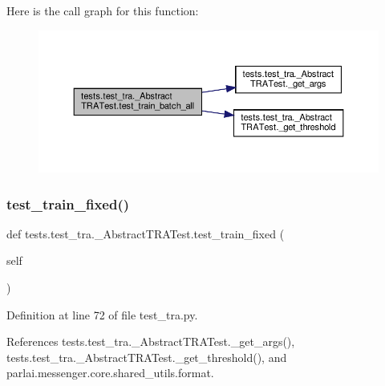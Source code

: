 Here is the call graph for this function\+:
\nopagebreak
\begin{figure}[H]
\begin{center}
\leavevmode
\includegraphics[width=350pt]{classtests_1_1test__tra_1_1__AbstractTRATest_a5e0358ae47540ed9b0583e75ac1d9a49_cgraph}
\end{center}
\end{figure}
\mbox{\label{classtests_1_1test__tra_1_1__AbstractTRATest_a30a5312eaf7639e762ddbd410e31332c}} 
\subsubsection{\texorpdfstring{test\+\_\+train\+\_\+fixed()}{test\_train\_fixed()}}
{\footnotesize\ttfamily def tests.\+test\+\_\+tra.\+\_\+\+Abstract\+T\+R\+A\+Test.\+test\+\_\+train\+\_\+fixed (\begin{DoxyParamCaption}\item[{}]{self }\end{DoxyParamCaption})}



Definition at line 72 of file test\+\_\+tra.\+py.



References tests.\+test\+\_\+tra.\+\_\+\+Abstract\+T\+R\+A\+Test.\+\_\+get\+\_\+args(), tests.\+test\+\_\+tra.\+\_\+\+Abstract\+T\+R\+A\+Test.\+\_\+get\+\_\+threshold(), and parlai.\+messenger.\+core.\+shared\+\_\+utils.\+format.


